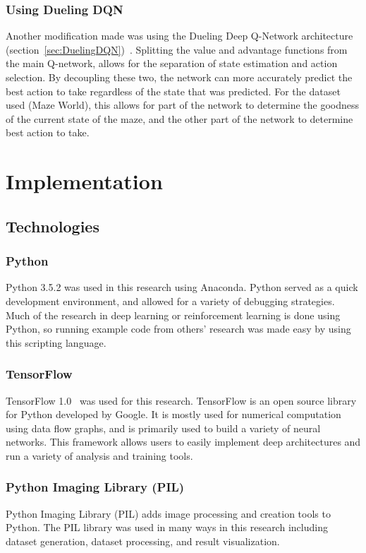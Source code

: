 \documentclass[12pt,american]{report}
\begin{document}
\subsection{Using Dueling DQN}
Another modification made was using the Dueling Deep Q-Network architecture (section~\ref{sec:DuelingDQN})~\cite{wang2015dueling}.  Splitting the value and advantage functions from the main Q-network, allows for the separation of state estimation and action selection.  By decoupling these two, the network can more accurately predict the best action to take regardless of the state that was predicted. For the dataset used (Maze World), this allows for part of the network to determine the goodness of the current state of the maze, and the other part of the network to determine best action to take. 


\chapter{Implementation}
\label{sec:implementation}
\section{Technologies}
\subsection{Python}
Python 3.5.2 was used in this research using Anaconda.  Python served as a quick development environment, and allowed for a variety of debugging strategies.  Much of the research in deep learning or reinforcement learning is done using Python, so running example code from others' research was made easy by using this scripting language.
\subsection{TensorFlow}
TensorFlow 1.0~\cite{tensorflow2015-whitepaper} was used for this research.  TensorFlow is an open source library for Python developed by Google.  It is mostly used for numerical computation using data flow graphs, and is primarily used to build a variety of neural networks.  This framework allows users to easily implement deep architectures and run a variety of analysis and training tools.  
\subsection{Python Imaging Library (PIL)}
Python Imaging Library (PIL) adds image processing and creation tools to Python. The PIL library was used in many ways in this research including dataset generation, dataset processing, and result visualization.
\end{document}
